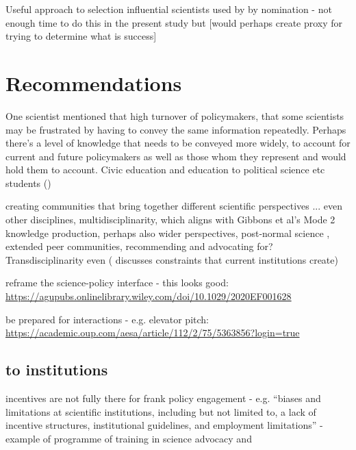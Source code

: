 Useful approach to selection influential scientists used by \textcite{HaynesDCRHGS2011} by nomination - not enough time to do this in the present study but [would perhaps create proxy for trying to determine what is success]

\section{Recommendations}
One scientist mentioned that high turnover of policymakers, that some scientists may be frustrated by having to convey the same information repeatedly. Perhaps there's a level of knowledge that needs to be conveyed more widely, to account for current and future policymakers as well as those whom they represent and would hold them to account. Civic education and education to political science etc students (\cite{DykeM2024}) 

creating communities that bring together different scientific perspectives ... even other disciplines, multidisciplinarity, which aligns with Gibbons et al's Mode 2 knowledge production, perhaps also wider perspectives, post-normal science \cite{FuntowiczR1993}, extended peer communities, \cite{Jasanoff2003} recommending and advocating for? Transdisciplinarity even (\textcite{RussellWC2008} discusses constraints that current institutions create)

reframe the science-policy interface - this looks good: \url{https://agupubs.onlinelibrary.wiley.com/doi/10.1029/2020EF001628}

be prepared for interactions - e.g. elevator pitch: \url{https://academic.oup.com/aesa/article/112/2/75/5363856?login=true}

\subsection{to institutions}
incentives are not fully there for frank policy engagement - e.g. \cite{ElsensohnACDGGKPRS2019} ``biases and limitations at scientific institutions, including but not limited to, a lack of incentive structures, institutional guidelines, and employment limitations'' - example of programme of training in science advocacy and \cite{RussellWC2008}